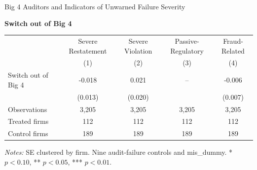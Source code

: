 \documentclass[10pt]{article}
\begin{document}
\fontsize{10}{12}\selectfont
\setlength{\tabcolsep}{3pt}\renewcommand{\arraystretch}{1.15}
\begin{center}\large Big 4 Auditors and Indicators of Unwarned Failure Severity\end{center}
\medskip\textbf{Switch out of Big 4}\par\smallskip
\begin{tabular*}{\textwidth}{@{\extracolsep{\fill}}lcccc@{}}
\toprule
 & Severe Restatement & Severe Violation & Passive-Regulatory & Fraud-Related \\
 & (1) & (2) & (3) & (4) \\
\midrule
Switch out of Big 4 & -0.018 & 0.021 & -- & -0.006 \\
 & (0.013) & (0.020) &  & (0.007) \\
Observations & 3,205 & 3,205 & 3,205 & 3,205 \\
Treated firms & 112 & 112 & 112 & 112 \\
Control firms & 189 & 189 & 189 & 189 \\
\bottomrule\end{tabular*}\par
\medskip\fontsize{9}{11}\selectfont\textit{Notes:} SE clustered by firm. Nine audit-failure controls and mis\_dummy. * $p<0.10$, ** $p<0.05$, *** $p<0.01$.
\end{document}
